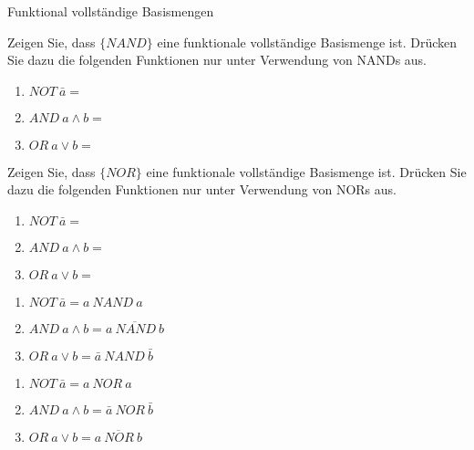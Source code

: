 \documentclass{exercisesheet}
\begin{document}
  \begin{exercise}{Funktional vollständige Basismengen}
    \item Zeigen Sie, dass $\{NAND\}$ eine funktionale vollständige Basismenge ist. Drücken Sie dazu die folgenden Funktionen nur unter Verwendung von NANDs aus.
      \begin{enumerate}
        \item $NOT\ \bar{a} = $
        \item $AND\ a \land b = $
        \item $OR\ a \lor b = $
      \end{enumerate}
    \item Zeigen Sie, dass $\{NOR\}$ eine funktionale vollständige Basismenge ist. Drücken Sie dazu die folgenden Funktionen nur unter Verwendung von NORs aus.
      \begin{enumerate}
        \item $NOT\ \bar{a} = $
        \item $AND\ a \land b = $
        \item $OR\ a \lor b = $
      \end{enumerate}
  \end{exercise}

  \begin{solution}
    \item
      \begin{enumerate}
        \item $NOT\ \bar{a} = a\ NAND\ a$
        \item $AND\ a \land b = \overline{a\ NAND\ b}$
        \item $OR\ a \lor b = \bar{a}\ NAND\ \bar{b}$
      \end{enumerate}
    \item
      \begin{enumerate}
        \item $NOT\ \bar{a} = a\ NOR\ a$
        \item $AND\ a \land b = \bar{a}\ NOR\ \bar{b}$
        \item $OR\ a \lor b = \overline{a\ NOR\ b}$
      \end{enumerate}
  \end{solution}
\end{document}
